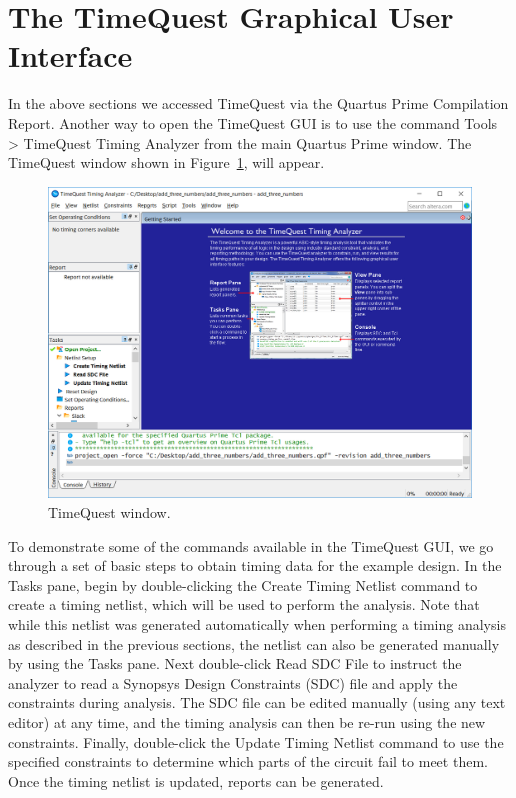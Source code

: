 \documentclass[11pt, twoside, pdftex]{article}
\begin{document}
\newpage
\section{The TimeQuest Graphical User Interface}
\label{sec:TQGUI}

In the above sections we accessed TimeQuest via the Quartus Prime Compilation Report. Another
way to open the TimeQuest GUI is to use the command {\sf Tools > TimeQuest Timing Analyzer}
from the main Quartus Prime window. The TimeQuest window shown in Figure~\ref{fig:5}, will appear.

\begin{figure}[H]
\begin{center}
\includegraphics[scale=0.5]{figures/figure5.png}
\end{center}
\caption{TimeQuest window.}
\label{fig:5}
\end{figure}

To demonstrate some of the commands available in the TimeQuest GUI, we go through a set of basic 
steps to obtain timing data for the example design. In the Tasks pane, begin by double-clicking
the {\sf Create Timing Netlist} command to create a timing netlist, which will be used to perform 
the analysis. Note that while this netlist was generated automatically when performing a timing 
analysis as described in the previous sections, the netlist can also be generated manually 
by using the Tasks pane. Next double-click {\sf Read SDC File} to instruct the analyzer to 
read a Synopsys Design Constraints (SDC) file and apply the constraints during analysis.
The SDC file can be edited manually (using any text editor) at any time, and the timing
analysis can then be re-run using the new constraints. 
Finally, double-click the {\sf Update Timing Netlist} command to use the specified 
constraints to determine which parts of the circuit fail 
to meet them. Once the timing netlist is updated, reports can be generated.
\end{document}
